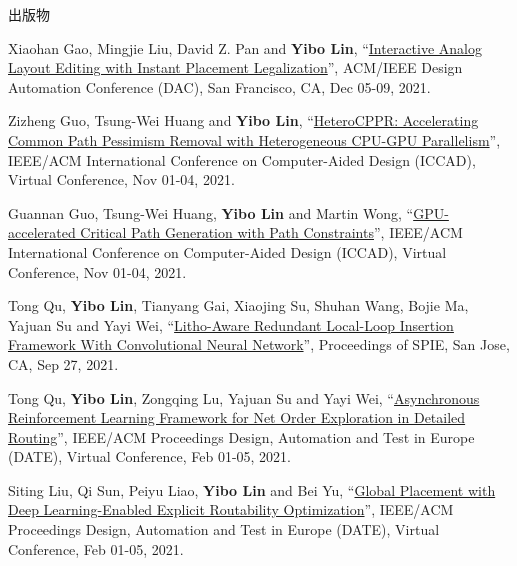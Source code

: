\begin{rSection}{出版物}
\begin{description}[font=\normalfont, rightmargin=2em]
{}
            

\item[{[C51]}]{
        Xiaohan Gao, Mingjie Liu, David Z. Pan and \textbf{Yibo Lin}, 
    ``\href{https://doi.org/10.1109/DAC18074.2021.9586234}{Interactive Analog Layout Editing with Instant Placement Legalization}'', 
    ACM/IEEE Design Automation Conference (DAC), San Francisco, CA, Dec 05-09, 2021.
    
}
            

\item[{[C50]}]{
        Zizheng Guo, Tsung-Wei Huang and \textbf{Yibo Lin}, 
    ``\href{https://doi.org/10.1109/ICCAD51958.2021.9643457}{HeteroCPPR: Accelerating Common Path Pessimism Removal with Heterogeneous CPU-GPU Parallelism}'', 
    IEEE/ACM International Conference on Computer-Aided Design (ICCAD), Virtual Conference, Nov 01-04, 2021.
    
}
            

\item[{[C49]}]{
        Guannan Guo, Tsung-Wei Huang, \textbf{Yibo Lin} and Martin Wong, 
    ``\href{https://doi.org/10.1109/ICCAD51958.2021.9643504}{GPU-accelerated Critical Path Generation with Path Constraints}'', 
    IEEE/ACM International Conference on Computer-Aided Design (ICCAD), Virtual Conference, Nov 01-04, 2021.
    
}
            

\item[{[C48]}]{
        Tong Qu, \textbf{Yibo Lin}, Tianyang Gai, Xiaojing Su, Shuhan Wang, Bojie Ma, Yajuan Su and Yayi Wei, 
    ``\href{https://doi.org/10.1117/12.2601685}{Litho-Aware Redundant Local-Loop Insertion Framework With Convolutional Neural Network}'', 
    Proceedings of SPIE, San Jose, CA, Sep 27, 2021.
    
}
            

\item[{[C47]}]{
        Tong Qu, \textbf{Yibo Lin}, Zongqing Lu, Yajuan Su and Yayi Wei, 
    ``\href{https://doi.org/10.23919/DATE51398.2021.9474007}{Asynchronous Reinforcement Learning Framework for Net Order Exploration in Detailed Routing}'', 
    IEEE/ACM Proceedings Design, Automation and Test in Europe (DATE), Virtual Conference, Feb 01-05, 2021.
    
}
            

\item[{[C46]}]{
        Siting Liu, Qi Sun, Peiyu Liao, \textbf{Yibo Lin} and Bei Yu, 
    ``\href{https://doi.org/10.23919/DATE51398.2021.9473959}{Global Placement with Deep Learning-Enabled Explicit Routability Optimization}'', 
    IEEE/ACM Proceedings Design, Automation and Test in Europe (DATE), Virtual Conference, Feb 01-05, 2021.
    
}
\end{description}
\end{rSection}
